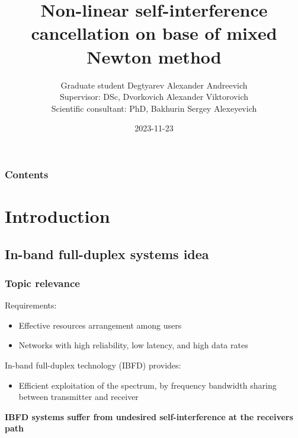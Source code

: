 \documentclass{beamer}
\title{Non-linear self-interference cancellation on base of mixed Newton method}
\author[Degtyarev Alexander]{Graduate student Degtyarev Alexander Andreevich\\ 
\small Supervisor: DSc, Dvorkovich Alexander Viktorovich \\
\small Scientific consultant:  PhD, Bakhurin Sergey Alexeyevich}
\institute{MIPT \\
Department of Multimedia Technologies and Telecommunications
}
\date{2023-11-23}
\begin{document}
\begin{frame}[plain]
\titlepage
\end{frame}


\begin{frame}
\frametitle{Contents}
\tableofcontents
\end{frame}


\section{Introduction}
\subsection{In-band full-duplex systems idea}

\begin{frame}
\frametitle{Topic relevance}
Requirements:
\begin{itemize}
\item Effective resources arrangement among users
\item Networks with high reliability, low latency, and high data rates
\end{itemize}
In-band full-duplex technology (IBFD) provides:
\begin{itemize}
	\item Efficient exploitation of the spectrum, by frequency bandwidth sharing between transmitter and receiver
\end{itemize}
\textbf{IBFD systems suffer from undesired self-interference at the receivers path}
\end{frame}
\end{document}
